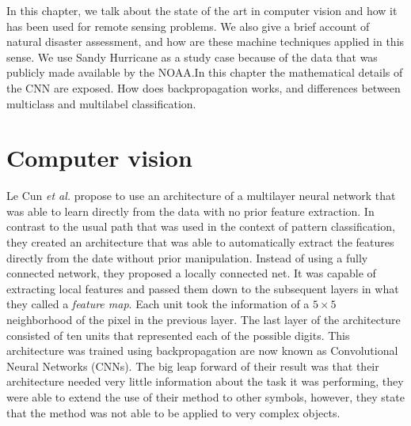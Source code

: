 In this chapter, we talk about the state of the art in computer vision and how it has been used for remote sensing problems. We also give a brief account of natural disaster assessment, and how are these machine techniques applied in this sense. We use Sandy Hurricane as a study case because of the data that was publicly made available by the NOAA.In this chapter the mathematical details of the CNN are exposed. How does backpropagation works, and differences between multiclass and multilabel classification.\\

\section{Computer vision}

Le Cun \textit{et al.} \cite{119325} propose to use an architecture of a multilayer neural network that was able to learn directly from the data with no prior feature extraction. In contrast to the usual path that was used in the context of pattern classification, they created an architecture that was able to automatically extract the features directly from the date without prior manipulation. Instead of using a fully connected network, they proposed a locally connected net. It was capable of extracting local features and passed them down to the subsequent layers in what they called a \textit{feature map}. Each unit took the information of a $5\times 5$ neighborhood of the pixel in the previous layer. The last layer of the architecture consisted of ten units that represented each of the possible digits. This architecture was trained using backpropagation are now known as Convolutional Neural Networks (CNNs). The big leap forward of their result was that their architecture needed very little information about the task it was performing, they were able to extend the use of their method to other symbols, however, they state that the method was not able to be applied to very complex objects.\\

